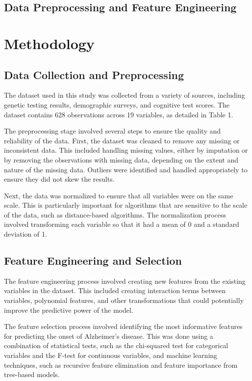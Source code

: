 \documentclass[conference]{IEEEtran}
\begin{document}
\subsection{Data Preprocessing and Feature Engineering}
\section{Methodology}

\subsection{Data Collection and Preprocessing}
The dataset used in this study was collected from a variety of sources, including genetic testing results, demographic surveys, and cognitive test scores. The dataset contains 628 observations across 19 variables, as detailed in Table 1. 

The preprocessing stage involved several steps to ensure the quality and reliability of the data. First, the dataset was cleaned to remove any missing or inconsistent data. This included handling missing values, either by imputation or by removing the observations with missing data, depending on the extent and nature of the missing data. Outliers were identified and handled appropriately to ensure they did not skew the results. 

Next, the data was normalized to ensure that all variables were on the same scale. This is particularly important for algorithms that are sensitive to the scale of the data, such as distance-based algorithms. The normalization process involved transforming each variable so that it had a mean of 0 and a standard deviation of 1.

\subsection{Feature Engineering and Selection}
The feature engineering process involved creating new features from the existing variables in the dataset. This included creating interaction terms between variables, polynomial features, and other transformations that could potentially improve the predictive power of the model.

The feature selection process involved identifying the most informative features for predicting the onset of Alzheimer's disease. This was done using a combination of statistical tests, such as the chi-squared test for categorical variables and the F-test for continuous variables, and machine learning techniques, such as recursive feature elimination and feature importance from tree-based models.
\end{document}
